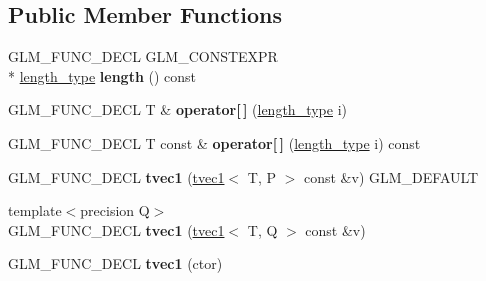 \subsection*{Public Member Functions}
\begin{DoxyCompactItemize}
\item 
\hypertarget{structglm_1_1tvec1_a2e03b5b249f2ae5461cab955e282655d}{G\-L\-M\-\_\-\-F\-U\-N\-C\-\_\-\-D\-E\-C\-L G\-L\-M\-\_\-\-C\-O\-N\-S\-T\-E\-X\-P\-R \\*
\hyperlink{structglm_1_1tvec1_ae6254cf662020a8328b744b40f419527}{length\-\_\-type} {\bfseries length} () const }\label{structglm_1_1tvec1_a2e03b5b249f2ae5461cab955e282655d}

\item 
\hypertarget{structglm_1_1tvec1_a51ab9cbe89195b12a6f12e5f7fb11636}{G\-L\-M\-\_\-\-F\-U\-N\-C\-\_\-\-D\-E\-C\-L T \& {\bfseries operator\mbox{[}$\,$\mbox{]}} (\hyperlink{structglm_1_1tvec1_ae6254cf662020a8328b744b40f419527}{length\-\_\-type} i)}\label{structglm_1_1tvec1_a51ab9cbe89195b12a6f12e5f7fb11636}

\item 
\hypertarget{structglm_1_1tvec1_a3e8b203a7c85a57d4d02a77e5b408f0b}{G\-L\-M\-\_\-\-F\-U\-N\-C\-\_\-\-D\-E\-C\-L T const \& {\bfseries operator\mbox{[}$\,$\mbox{]}} (\hyperlink{structglm_1_1tvec1_ae6254cf662020a8328b744b40f419527}{length\-\_\-type} i) const }\label{structglm_1_1tvec1_a3e8b203a7c85a57d4d02a77e5b408f0b}

\item 
\hypertarget{structglm_1_1tvec1_afdc7978199735e086cb3cc9f225ccac1}{G\-L\-M\-\_\-\-F\-U\-N\-C\-\_\-\-D\-E\-C\-L {\bfseries tvec1} (\hyperlink{structglm_1_1tvec1}{tvec1}$<$ T, P $>$ const \&v) G\-L\-M\-\_\-\-D\-E\-F\-A\-U\-L\-T}\label{structglm_1_1tvec1_afdc7978199735e086cb3cc9f225ccac1}

\item 
\hypertarget{structglm_1_1tvec1_aed34e6b477b4a8ce31f6eda0a4697aad}{{\footnotesize template$<$precision Q$>$ }\\G\-L\-M\-\_\-\-F\-U\-N\-C\-\_\-\-D\-E\-C\-L {\bfseries tvec1} (\hyperlink{structglm_1_1tvec1}{tvec1}$<$ T, Q $>$ const \&v)}\label{structglm_1_1tvec1_aed34e6b477b4a8ce31f6eda0a4697aad}

\item 
\hypertarget{structglm_1_1tvec1_a132d7069710a0c0be51db22720cec38c}{G\-L\-M\-\_\-\-F\-U\-N\-C\-\_\-\-D\-E\-C\-L {\bfseries tvec1} (ctor)}\label{structglm_1_1tvec1_a132d7069710a0c0be51db22720cec38c}


\end{DoxyCompactItemize}

